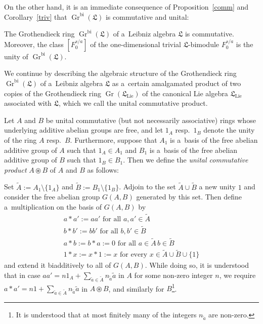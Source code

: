 \documentclass{jonasart}
\DeclareMathOperator{\bi}{bi}
\DeclareMathOperator{\K}{Gr}
\DeclareMathOperator{\lie}{Lie}
\newcommand{\lf}{\mathfrak{L}}
\begin{document}
	On the other hand, it is an immediate consequence of Proposition~\ref{comm} and Corollary~\ref{triv} that $\K^{\bi}(\lf)$ is commutative and unital:
	\begin{proposition}\label{unitalcomm}
		The Grothendieck ring $\K^{\bi}(\lf)$ of a~Leibniz algebra $\lf$
		is commutative. Moreover, the class $[F_0^{s/a}]$ of the one-dimensional trivial $\lf$-bimodule $F_0^{s/a}$ is the unity of
		$\K^{\bi}(\lf)$.
	\end{proposition}
	We continue by describing the algebraic structure of the Grothendieck ring $\K^{\bi}(\lf)$ of a~Leibniz algebra $\lf$ as a~certain amalgamated product of two copies of the Grothendieck ring $\K(\lf_{\lie})$ of the canonical Lie algebra $\lf_{\lie}$ associated with $\lf$, which we call the unital commutative product.

	Let $A$ and $B$ be unital commutative (but not necessarily associative)
	rings whose underlying additive abelian groups are free, and let $1_A$
	resp.\ $1_B$ denote the unity of the ring $A$ resp.\ $B$. Furthermore, suppose that $A_1$ is a~basis of the free abelian additive group of $A$
	such that $1_A\in A_1$ and $B_1$ is a~basis of the free abelian additive group of $B$ such that $1_B\in B_1$. Then we define the \emph{unital commutative product\/} $A\circledast B$ of $A$ and $B$ as follows:

	Set $\widetilde{A}:=A_1\setminus\{1_A\}$ and $\widetilde{B}:=B_1
	\setminus\{1_B\}$. Adjoin to the set $\widetilde{A}\cup\widetilde{B}$
	a new unity $1$ and consider the free abelian group $G(A,B)$ generated by this set. Then define a~multiplication on the basis of $G(A,B)$ by
	\begin{gather}\label{A}
		a*a':=aa'\mbox{ for all }a,a'\in\widetilde{A} \\
		\label{B}
		b*b':=bb'\mbox{ for all }b, b'\in\widetilde{B} \\
		\label{zero}
		a*b:=b*a:=0\mbox{ for all }a\in\widetilde{A}\,b\in\widetilde{B} \\
		\label{unity}
		1*x:=x*1:=x\mbox{ for every }x\in\widetilde{A}\cup\widetilde{B}\cup\{1\}
	\end{gather}
	and extend it biadditively to all of $G(A,B)$. While doing so, it is understood that in case $aa'=n1_A +\sum_{\tilde{a}\in\widetilde{A}}n_{\tilde{a}}
	\tilde{a}$ in $A$ for some non-zero integer $n$, we require $a*a'=n1+
	\sum_{\tilde{a}\in\widetilde{A}}n_{\tilde{a}}\tilde{a}$ in $A\circledast
	B$, and similarly for $B$\footnote{It is understood that at most finitely many of the integers $n_{\tilde{a}}$ are non-zero.}.
\end{document}
